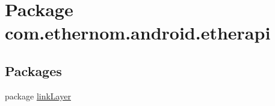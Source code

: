 \hypertarget{namespacecom_1_1ethernom_1_1android_1_1etherapi}{}\section{Package com.\+ethernom.\+android.\+etherapi}
\label{namespacecom_1_1ethernom_1_1android_1_1etherapi}
\subsection*{Packages}
\begin{DoxyCompactItemize}
\item 
package \mbox{\hyperlink{namespacecom_1_1ethernom_1_1android_1_1etherapi_1_1link_layer}{link\+Layer}}
\end{DoxyCompactItemize}
